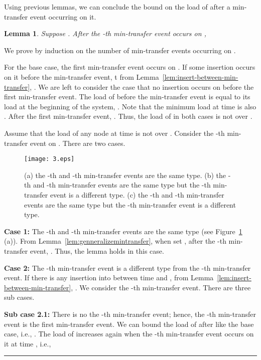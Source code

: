 \documentclass[a4paper]{article}
\newtheorem{lemma}{Lemma}
\newenvironment{proof}{{\bf Proof:}}{\hfill\rule{1.5mm}{3mm}\vspace{0.1in}}
\begin{document}
Using previous lemmas, we can conclude the bound on the load of 
after a min-transfer event occurring on it.

\begin{lemma}
  \label{lem:min-transfer}
  Suppose . After the -th
  min-transfer event occurs on , 
\end{lemma}

\begin{proof}
  We prove by induction on the number of min-transfer events occurring
  on .
  
  For the base case, the first min-transfer event occurs on .  If
  some insertion occurs on it before the min-transfer event, t
  from Lemma~\ref{lem:insert-between-min-transfer}, 
  . We are left to consider the
  case that no insertion occurs on  before the first min-transfer
  event.  The load of  before the min-transfer event is equal to its
  load at the beginning of the system, . Note that the minimum
  load at time  is also . After the first
  min-transfer event, . Thus, the load of  
   in both cases is not over .
    
  Assume that the load of any node at time  is not over . Consider the -th min-transfer event on
  . There are two cases.

  \begin{figure}
    \centering \texttt{[image: 3.eps]}
    \caption{(a) the -th and -th min-transfer events are the same
      type. (b) the -th and -th min-transfer events are the same
      type but the -th min-transfer event is a different type.
      (c) the -th and -th min-transfer events are the same
      type but the -th min-transfer event is a different type.}
    \label{fig:3}
  \end{figure}

  \textbf{Case 1:} The -th and -th min-transfer events
  are the same type (see Figure~\ref{fig:3} (a)).  From
  Lemma~\ref{lem:genneralizemintransfer}, when set , after the
  -th min-transfer event, . 
  Thus, the lemma holds in this case.

  \textbf{Case 2:} The -th min-transfer event is a different type
  from the -th min-transfer event. If there is any insertion into
   between time  and , from
  Lemma~\ref{lem:insert-between-min-transfer}, 
  .  We consider the -th
  min-transfer event.  There are three sub cases.

  \textbf{Sub case 2.1:} There is no the -th min-transfer event;
  hence, the -th min-transfer event is the first min-transfer event. 
  We can bound the load of  after  like the base case,
  i.e., . The load of 
  increases again when the -th min-transfer event occurs on
  it at time , i.e.,
  

\end{proof}
\end{document}
